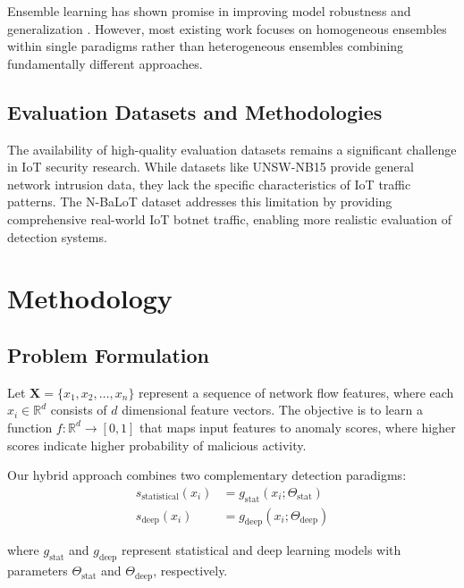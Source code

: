 \documentclass[conference]{IEEEtran}
\begin{document}
Ensemble learning has shown promise in improving model robustness and generalization \cite{dietterich2000ensemble}. However, most existing work focuses on homogeneous ensembles within single paradigms rather than heterogeneous ensembles combining fundamentally different approaches.

\subsection{Evaluation Datasets and Methodologies}

The availability of high-quality evaluation datasets remains a significant challenge in IoT security research. While datasets like UNSW-NB15 \cite{moustafa2015unsw} provide general network intrusion data, they lack the specific characteristics of IoT traffic patterns. The N-BaLoT dataset \cite{meidan2018n} addresses this limitation by providing comprehensive real-world IoT botnet traffic, enabling more realistic evaluation of detection systems.

\section{Methodology}

\subsection{Problem Formulation}

Let $\mathbf{X} = \{x_1, x_2, \ldots, x_n\}$ represent a sequence of network flow features, where each $x_i \in \mathbb{R}^d$ consists of $d$ dimensional feature vectors. The objective is to learn a function $f: \mathbb{R}^d \rightarrow [0,1]$ that maps input features to anomaly scores, where higher scores indicate higher probability of malicious activity.

Our hybrid approach combines two complementary detection paradigms:
\begin{align}
s_{\text{statistical}}(x_i) &= g_{\text{stat}}(x_i; \Theta_{\text{stat}}) \\
s_{\text{deep}}(x_i) &= g_{\text{deep}}(x_i; \Theta_{\text{deep}})
\end{align}

where $g_{\text{stat}}$ and $g_{\text{deep}}$ represent statistical and deep learning models with parameters $\Theta_{\text{stat}}$ and $\Theta_{\text{deep}}$, respectively.
\end{document}
